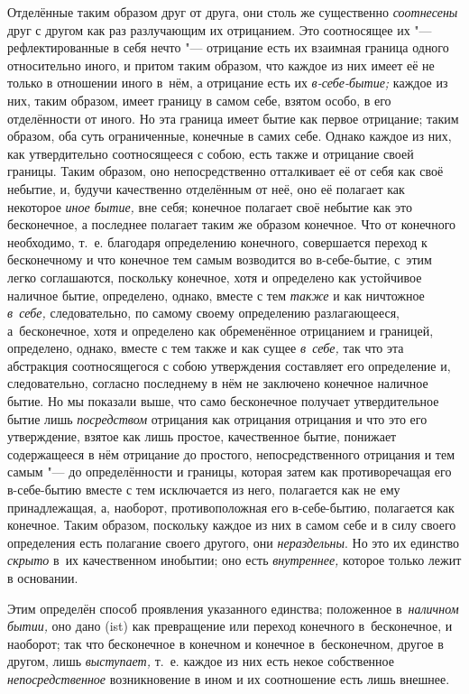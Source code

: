 Отделённые таким образом друг от друга, они столь же существенно
{\em соотнесены} друг с другом как раз разлучающим их отрицанием. Это
соотносящее их "--- рефлектированные в себя нечто "--- отрицание есть их
взаимная граница одного относительно иного, и притом таким образом, что каждое
из них имеет её не только в отношении иного в~нём, а отрицание есть их
{\em в-себе-бытие;} каждое из них, таким образом, имеет границу в самом себе,
взятом особо, в его отделённости от иного. Но эта граница имеет бытие как
первое отрицание; таким образом, оба суть ограниченные, конечные в самих себе.
Однако каждое из них, как утвердительно соотносящееся с собою, есть также и
отрицание своей границы. Таким образом, оно непосредственно отталкивает её от
себя как своё небытие, и, будучи качественно отделённым от неё, оно её полагает
как некоторое {\em иное бытие,} вне себя; конечное полагает своё небытие как
это бесконечное, а последнее полагает таким же образом конечное. Что от
конечного необходимо, т.~е. благодаря определению конечного, совершается
переход к бесконечному и что конечное тем самым возводится во в-себе-бытие,
с~этим легко соглашаются, поскольку конечное, хотя и определено как устойчивое
наличное бытие, определено, однако, вместе с тем {\em также} и как ничтожное
{\em в~себе,} следовательно, по самому своему определению разлагающееся,
а~бесконечное, хотя и определено как обременённое отрицанием и границей,
определено, однако, вместе с тем также и как сущее {\em в~себе,} так что эта
абстракция соотносящегося с собою утверждения составляет его определение и,
следовательно, согласно последнему в нём не заключено конечное наличное бытие.
Но мы показали выше, что само бесконечное получает утвердительное бытие лишь
{\em посредством} отрицания как отрицания отрицания и что это его утверждение,
взятое как лишь простое, качественное бытие, понижает содержащееся в нём
отрицание до простого, непосредственного отрицания и тем самым "--- до
определённости и границы, которая затем как противоречащая его в-себе-бытию
вместе с тем исключается из него, полагается как не ему принадлежащая, а,
наоборот, противоположная его в-себе-бытию, полагается как конечное. Таким
образом, поскольку каждое из них в самом себе и в силу своего определения есть
полагание своего другого, они {\em нераздельны}. Но это их единство
{\em скрыто} в~их качественном инобытии; оно есть {\em внутреннее,} которое
только лежит в основании.

Этим определён способ проявления указанного единства; положенное
в~{\em наличном бытии,} оно дано (ist) как превращение или переход конечного
в~бесконечное, и наоборот; так что бесконечное в конечном и конечное
в~бесконечном, другое в другом, лишь {\em выступает,} т.~е. каждое из них есть
некое собственное {\em непосредственное} возникновение в ином и их соотношение
есть лишь внешнее.

